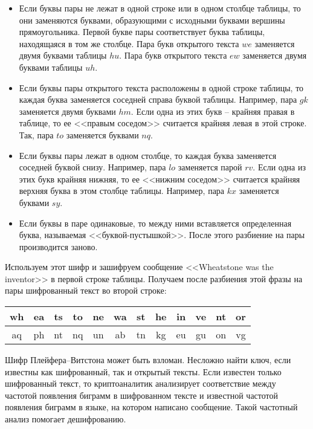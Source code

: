 \begin{itemize}
    \item Если буквы пары не лежат в одной строке или в одном столбце таблицы, то они заменяются буквами, образующими с исходными буквами вершины прямоугольника. Первой букве пары соответствует буква таблицы, находящаяся в том же столбце. Пара букв открытого текста $we$ заменяется двумя буквами таблицы $hu$. Пара букв открытого текста $ew$ заменяется двумя буквами таблицы $uh$.
    \item Если буквы пары открытого текста расположены в одной строке таблицы, то каждая буква заменяется соседней справа буквой таблицы. Например, пара $gk$  заменяется двумя буквами $hm$. Если одна из этих букв -- крайняя правая в таблице, то ее <<правым соседом>> считается крайняя левая в этой строке. Так, пара $to$ заменяется буквами $nq$.
    \item Если буквы пары лежат в одном столбце, то каждая буква заменяется соседней буквой снизу. Например, пара $lo$ заменяется парой $rv$. Если одна из этих букв крайняя нижняя, то ее <<нижним соседом>> считается крайняя верхняя буква в этом столбце таблицы. Например, пара $kx$ заменяется буквами $sy$.
    \item Если буквы в паре одинаковые, то между ними вставляется определенная буква, называемая <<буквой-пустышкой>>. После этого разбиение на пары производится заново.
\end{itemize}

\example
Используем этот шифр и зашифруем сообщение <<Wheatstone was the inventor>> в первой строке таблицы. Получаем после разбиения этой фразы на пары шифрованный текст во второй строке:
\begin{center} \begin{tabular}{|*{12}c|}
    \hline
    wh & ea & ts & to & ne & wa & st & he & in & ve & nt & or \\
    \hline
    aq & ph & nt & nq & un & ab & tn & kg & eu & gu & on & vg \\
    \hline
\end{tabular} \end{center}
\exampleend

Шифр Плейфера--Витстона может быть взломан. Несложно найти ключ, если известны как шифрованный, так и открытый тексты. Если известен только шифрованный текст, то криптоаналитик анализирует соответствие между частотой появления биграмм в шифрованном тексте и известной частотой появления биграмм в языке, на котором написано сообщение. Такой частотный анализ помогает дешифрованию.
